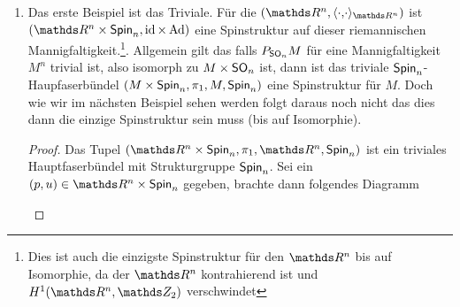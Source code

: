 \begin{Bsp}
  \begin{enumerate}[(1)]
  \item Das erste Beispiel ist das Triviale. Für die \RMF
    $(\R^n, \scdots_{\R^n})$ ist
    $(\R^n \times \spin_n,\id \times \Ad)$ eine Spinstruktur auf
    dieser riemannischen Mannigfaltigkeit.\footnote{Dies ist auch die
      einzigste Spinstruktur für den $ \R^n $ bis auf
      Isomorphie, da der $ \R^n $ kontrahierend ist und $ H^1(\R^n,\Z_2) $ verschwindet}. Allgemein gilt das falls $ P_{\operatorname{\mathsf{SO}}_n}M $ für eine Mannigfaltigkeit
    $ M^n $ trivial ist, also isomorph zu $ M\times \operatorname{\mathsf{SO}}_n $ ist,
    dann ist das triviale $ \operatorname{\mathsf{Spin}}_n $-Haupfaserbündel
    $ (M\times \operatorname{\mathsf{Spin}}_n,\pi_1,M,\operatorname{\mathsf{Spin}}_n) $ eine Spinstruktur für $ M $.
    Doch wie wir im nächsten Beispiel sehen werden folgt daraus noch
    nicht das dies dann die einzige Spinstruktur sein muss (bis auf
    Isomorphie).
    \begin{proof}
      Das Tupel $ (\R^n\times \spin_n,\pi_1,\R^n,\spin_n) $ ist ein
      triviales Hauptfaserbündel mit Strukturgruppe $ \operatorname{\mathsf{Spin}}_n $.  Sei
      ein $ (p,u)\in \R^n\times \spin_n $ gegeben, brachte dann
      folgendes Diagramm
			
      \begin{center}
					
      \end{center}

    \end{proof}
		

\end{enumerate}
\end{Bsp}
